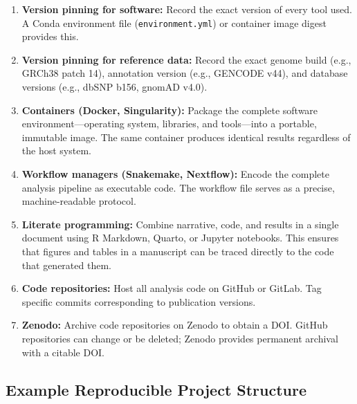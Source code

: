 \begin{enumerate}[itemsep=3pt]
  \item \textbf{Version pinning for software:} Record the exact version of every tool used. A Conda environment file (\texttt{environment.yml}) or container image digest provides this.

  \item \textbf{Version pinning for reference data:} Record the exact genome build (e.g., GRCh38 patch 14), annotation version (e.g., GENCODE v44), and database versions (e.g., dbSNP b156, gnomAD v4.0).

  \item \textbf{Containers (Docker, Singularity):} Package the complete software environment---operating system, libraries, and tools---into a portable, immutable image. The same container produces identical results regardless of the host system.

  \item \textbf{Workflow managers (Snakemake, Nextflow):} Encode the complete analysis pipeline as executable code. The workflow file serves as a precise, machine-readable protocol.

  \item \textbf{Literate programming:} Combine narrative, code, and results in a single document using R Markdown, Quarto, or Jupyter notebooks. This ensures that figures and tables in a manuscript can be traced directly to the code that generated them.

  \item \textbf{Code repositories:} Host all analysis code on GitHub or GitLab. Tag specific commits corresponding to publication versions.

  \item \textbf{Zenodo:} Archive code repositories on Zenodo to obtain a DOI. GitHub repositories can change or be deleted; Zenodo provides permanent archival with a citable DOI.
\end{enumerate}

\subsection{Example Reproducible Project Structure}

